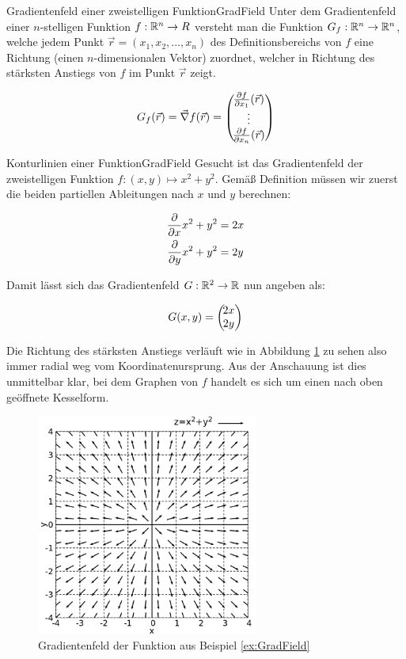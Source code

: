 \begin{definition}{Gradientenfeld einer zweistelligen Funktion}{GradField}
    Unter dem Gradientenfeld einer $n$-stelligen Funktion $f: \mathbb{R}^n \to R$ versteht man die Funktion $G_f: \mathbb{R}^n \to \mathbb{R}^n$, welche jedem Punkt $\vec{r}=(x_1,x_2,...,x_n)$ des Definitionsbereichs von $f$ eine Richtung (einen $n$-dimensionalen Vektor) zuordnet, welcher in Richtung des stärksten Anstiegs von $f$ im Punkt $\vec{r}$ zeigt.

    $$
        G_f(\vec{r}) = \vec\nabla f(\vec{r}) = \left(\negthinspace\begin{matrix}\frac{\partial f}{\partial x_1}(\vec{r})\\\vdots\\\frac{\partial f}{\partial x_n}(\vec{r})\end{matrix}\right)
    $$
\end{definition}

\begin{example}{Konturlinien einer Funktion}{GradField}
    Gesucht ist das Gradientenfeld der zweistelligen Funktion $f: (x,y) \mapsto x^2+y^2$. Gemäß Definition müssen wir zuerst die beiden partiellen Ableitungen nach $x$ und $y$ berechnen:

    \begin{alignat*}{1}
        \frac{\partial }{\partial x} x^2+y^2 &= 2x \\
        \frac{\partial }{\partial y} x^2+y^2 &= 2y
    \end{alignat*}

    Damit lässt sich das Gradientenfeld $G: \mathbb{R}^2 \to \mathbb{R}$ nun angeben als:

    $$
        G(x,y) = \left(\negthinspace\begin{matrix}2x\\2y\end{matrix}\right)
    $$

    Die Richtung des stärksten Anstiegs verläuft wie in Abbildung \ref{fig:ExGradField} zu sehen also immer radial weg vom Koordinatenursprung. Aus der Anschauung ist dies unmittelbar klar, bei dem Graphen von $f$ handelt es sich um einen nach oben geöffnete Kesselform.
\end{example}

\begin{figure}
    \centering
    \includegraphics[width=0.65\textwidth]{./gnuplot/example-gradient-field}
    \caption{Gradientenfeld der Funktion aus Beispiel \ref{ex:GradField}}
    \label{fig:ExGradField}
\end{figure}

